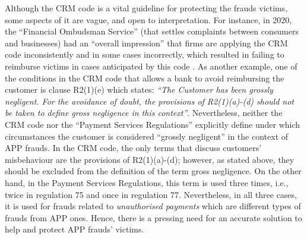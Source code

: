 


Although the CRM code is a vital guideline for protecting the frauds victims, some aspects of it are vague, and open to interpretation. For instance, in 2020, the ``Financial Ombudsman Service'' (that settles complaints between consumers and businesses)  had an ``overall impression'' that firms are applying the CRM code inconsistently and in some cases incorrectly, which resulted in failing to reimburse victims in cases anticipated by this code \cite{Financial-Ombudsman-Service-response}.
%
 As another example, one of the conditions in the CRM code that allows a bank to avoid reimbursing the customer is clause R2(1)(e) which states: \textit{``The Customer has been grossly negligent. For the avoidance of doubt, the provisions of R2(1)(a)-(d) should not be taken to define gross negligence in this context''}.  Nevertheless, neither the CRM code nor the ``Payment Services Regulations'' \cite{Regulations}   explicitly define under which circumstances the customer is considered ``grossly negligent'' in the context of  APP frauds. In the CRM code, the only terms that discuss customers' misbehaviour are the provisions of R2(1)(a)-(d); however, as stated above, they should be excluded from the definition of the term gross negligence. On the other hand,  in the Payment Services Regulations, this term is used three times, i.e.,  twice in regulation 75 and once in regulation 77. Nevertheless, in all three cases, it is used for frauds related to \emph{unauthorised payments} which are different types of frauds from  APP ones. Hence, there is a pressing need for an accurate solution to help and protect  APP frauds' victims. 


